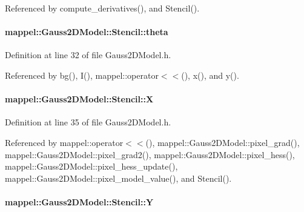 Referenced by compute\+\_\+derivatives(), and Stencil().

\paragraph[{\texorpdfstring{theta}{theta}}]{ mappel\+::\+Gauss2\+D\+Model\+::\+Stencil\+::theta}\hypertarget{classmappel_1_1Gauss2DModel_1_1Stencil_ac9ce60b33fe2235ebbb80dd9d90a49ad}{}\label{classmappel_1_1Gauss2DModel_1_1Stencil_ac9ce60b33fe2235ebbb80dd9d90a49ad}


Definition at line 32 of file Gauss2\+D\+Model.\+h.



Referenced by bg(), I(), mappel\+::operator$<$$<$(), x(), and y().

\paragraph[{\texorpdfstring{X}{X}}]{ mappel\+::\+Gauss2\+D\+Model\+::\+Stencil\+::X}\hypertarget{classmappel_1_1Gauss2DModel_1_1Stencil_a09ecf63ea4e36b797ac9d132e2f0e5a2}{}\label{classmappel_1_1Gauss2DModel_1_1Stencil_a09ecf63ea4e36b797ac9d132e2f0e5a2}


Definition at line 35 of file Gauss2\+D\+Model.\+h.



Referenced by mappel\+::operator$<$$<$(), mappel\+::\+Gauss2\+D\+Model\+::pixel\+\_\+grad(), mappel\+::\+Gauss2\+D\+Model\+::pixel\+\_\+grad2(), mappel\+::\+Gauss2\+D\+Model\+::pixel\+\_\+hess(), mappel\+::\+Gauss2\+D\+Model\+::pixel\+\_\+hess\+\_\+update(), mappel\+::\+Gauss2\+D\+Model\+::pixel\+\_\+model\+\_\+value(), and Stencil().

\paragraph[{\texorpdfstring{Y}{Y}}]{ mappel\+::\+Gauss2\+D\+Model\+::\+Stencil\+::Y}\hypertarget{classmappel_1_1Gauss2DModel_1_1Stencil_a83c1e9cdd33070a4c88bc0513eb569d7}{}\label{classmappel_1_1Gauss2DModel_1_1Stencil_a83c1e9cdd33070a4c88bc0513eb569d7}



